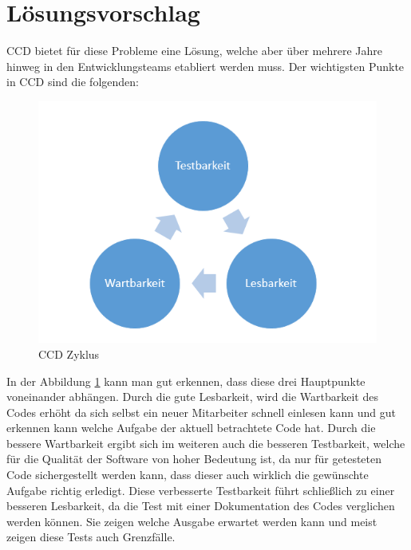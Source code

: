 \section{Lösungsvorschlag}
CCD bietet für diese Probleme eine Lösung, welche aber über mehrere Jahre hinweg in den Entwicklungsteams etabliert werden muss. Der wichtigsten Punkte in CCD sind die folgenden:

\begin{figure}[h]
	\centering
		\includegraphics[width=1.00\textwidth]{images/cycle.PNG}
	\caption{CCD Zyklus}
	\label{fig:cycle}
\end{figure}

In der Abbildung \ref{fig:cycle} kann man gut erkennen, dass diese drei Hauptpunkte voneinander abhängen. Durch die gute Lesbarkeit, wird die Wartbarkeit des Codes erhöht da sich selbst ein neuer Mitarbeiter schnell einlesen kann und gut erkennen kann welche Aufgabe der aktuell betrachtete Code hat. Durch die bessere Wartbarkeit ergibt sich im weiteren auch die besseren Testbarkeit, welche für die Qualität der Software von hoher Bedeutung ist, da nur für getesteten Code sichergestellt werden kann, dass dieser auch wirklich die gewünschte Aufgabe richtig erledigt. Diese verbesserte Testbarkeit führt schließlich zu einer besseren Lesbarkeit, da die Test mit einer Dokumentation des Codes verglichen werden können. Sie zeigen welche Ausgabe erwartet werden kann und meist zeigen diese Tests auch Grenzfälle.

